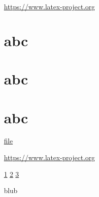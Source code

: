 \documentclass{article}
\begin{document}
\url{https://www.latex-project.org}

\section{abc}\label{sec}

\section{abc}\label{sec2}

\section{abc}\label{sec3}

\href{example-image.pdf}{file}

\newpage

\url{https://www.latex-project.org}


\ref{sec} \quad  \ref{sec2} \quad \ref{sec3}
\newpage

\newpage

blub
\end{document}
